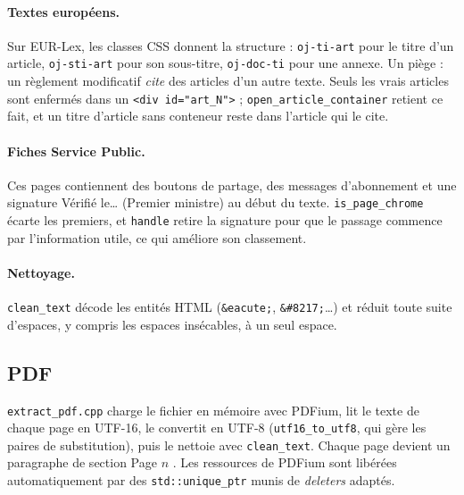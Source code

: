 \documentclass[11pt,a4paper]{article}
\newcommand{\fichier}[1]{\texttt{#1}}
\begin{document}
\paragraph{Textes européens.} Sur EUR-Lex, les classes CSS donnent la structure : \texttt{oj-ti-art} pour le titre d'un article, \texttt{oj-sti-art} pour son sous-titre, \texttt{oj-doc-ti} pour une annexe. Un piège : un règlement modificatif \emph{cite} des articles d'un autre texte. Seuls les vrais articles sont enfermés dans un \texttt{<div id="art\_N">} ; \texttt{open\_article\_container} retient ce fait, et un titre d'article sans conteneur reste dans l'article qui le cite.



\paragraph{Fiches Service Public.} Ces pages contiennent des boutons de partage, des messages d'abonnement et une signature \og Vérifié le\dots{} (Premier ministre) \fg{} au début du texte. \texttt{is\_page\_chrome} écarte les premiers, et \texttt{handle} retire la signature pour que le passage commence par l'information utile, ce qui améliore son classement.

\paragraph{Nettoyage.} \texttt{clean\_text} décode les entités HTML (\texttt{\&eacute;}, \texttt{\&\#8217;}\dots) et réduit toute suite d'espaces, y compris les espaces insécables, à un seul espace.

\subsection{PDF}

\fichier{extract\_pdf.cpp} charge le fichier en mémoire avec PDFium, lit le texte de chaque page en UTF-16, le convertit en UTF-8 (\texttt{utf16\_to\_utf8}, qui gère les paires de substitution), puis le nettoie avec \texttt{clean\_text}. Chaque page devient un paragraphe de section \og Page $n$ \fg. Les ressources de PDFium sont libérées automatiquement par des \texttt{std::unique\_ptr} munis de \emph{deleters} adaptés.
\end{document}
